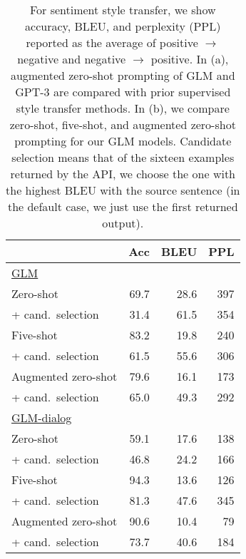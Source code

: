 \begin{table*}
\begin{subtable}{.58\linewidth}
    \end{subtable}
    \begin{subtable}{.40\linewidth}
    \centering \small 
        \begin{tabular}{l r r r}
        \toprule
         & Acc & BLEU & PPL\\
        \midrule
        \underline{GLM} \\
        Zero-shot & 69.7 & 28.6 & 397 \\
        + cand.~selection & 31.4 & 61.5 & 354\\
        Five-shot & 83.2 & 19.8 & 240\\
        + cand.~selection & 61.5 & 55.6 & 306\\
        Augmented zero-shot & 79.6 & 16.1 & 173\\
        + cand.~selection & 65.0 & 49.3 & 292\\
        \midrule
        \underline{GLM-dialog} \\
        Zero-shot & 59.1 & 17.6 & 138\\
        + cand.~selection & 46.8 & 24.2 & 166\\
        Five-shot & 94.3 & 13.6 & 126\\
        + cand.~selection & 81.3 & 47.6 & 345\\
        Augmented zero-shot & 90.6 & 10.4 & 79\\
        + cand.~selection & 73.7 & 40.6 & 184\\
        \bottomrule
        \end{tabular}
        \caption{}
        \label{tab:ablation}
    \end{subtable}
\caption{
For sentiment style transfer, we show accuracy, BLEU, and perplexity (PPL) reported as the average of positive $\rightarrow$ negative and negative $\rightarrow$ positive. 
In (a), augmented zero-shot prompting of GLM and GPT-3 are compared with prior supervised style transfer methods.
In (b), we compare zero-shot, five-shot, and augmented zero-shot prompting for our GLM models. 
Candidate selection means that of the sixteen examples returned by the API, we choose the one with the highest BLEU with the source sentence (in the default case, we just use the first returned output).  
}
\end{table*}
